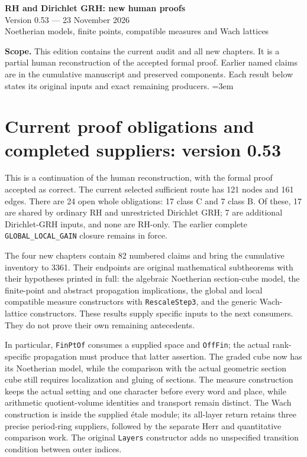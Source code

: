 \documentclass[11pt,a4paper]{article}
\numberwithin{equation}{section}
\theoremstyle{remark}\newtheorem{remark}[theorem]{Remark}
\begin{document}
\begin{center}
{\LARGE\bfseries RH and Dirichlet GRH: new human proofs}\\[7pt]
{\large Version 0.53 --- 23 November 2026}\\[5pt]
{\large Noetherian models, finite points, compatible measures and Wach lattices}
\end{center}
\textbf{Scope.} This edition contains the current audit and all new chapters.
It is a partial human reconstruction of the accepted formal proof.
Earlier named claims are in the cumulative manuscript and preserved components.
Each result below states its original inputs and exact remaining producers.
\setcounter{tocdepth}{1}
\tableofcontents
\clearpage
\begingroup\emergencystretch=3em
\section{Current proof obligations and completed suppliers: version 0.53}
\label{sec:dependency-audit-v53}

This is a continuation of the human reconstruction, with the formal
proof accepted as correct. The current selected sufficient route has
121 nodes and 161 edges. There are 24 open whole obligations:
17 class C and 7 class B. Of these, 17 are shared by ordinary
RH and unrestricted Dirichlet GRH; 7 are additional Dirichlet-GRH
inputs, and none are RH-only. The earlier complete
\texttt{GLOBAL\_\allowbreak LOCAL\_\allowbreak GAIN} closure remains in force.

The four new chapters contain 82 numbered claims and bring the
cumulative inventory to 3361. Their endpoints are original
mathematical subtheorems with their hypotheses printed in full:
the algebraic Noetherian section-cube model, the finite-point and
abstract propagation implications, the global and local compatible
measure constructors with \texttt{Rescale\allowbreak Step3}, and the generic
Wach-lattice constructors. These results supply specific inputs to
the next consumers. They do not prove their own remaining antecedents.

In particular, \texttt{Fin\allowbreak Pt\allowbreak Of} consumes a supplied space and
\texttt{Off\allowbreak Fin}; the actual rank-specific propagation must produce
that latter assertion. The graded cube now has its Noetherian model,
while the comparison with the actual geometric section cube still
requires localization and gluing of sections. The measure construction
keeps the actual setting and one character before every word and
place, while arithmetic quotient-volume identities and transport
remain distinct. The Wach construction is inside the supplied
\'etale module; its all-layer return retains three precise period-ring
suppliers, followed by the separate Herr and quantitative comparison
work. The original \texttt{Layers} constructor adds no unspecified
transition condition between outer indices.
\end{document}
